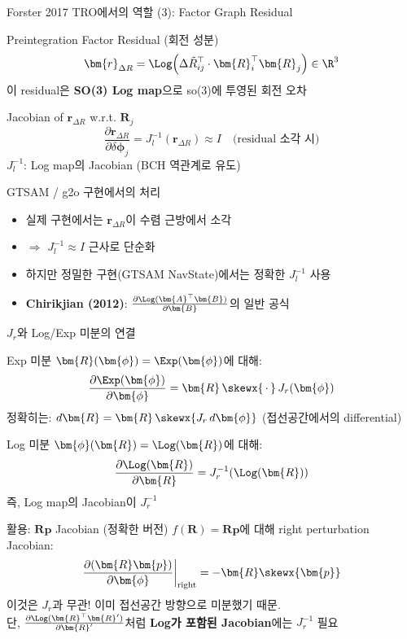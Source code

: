\begin{frame}{Forster 2017 TRO에서의 역할 (3): Factor Graph Residual}
  \begin{block}{Preintegration Factor Residual (회전 성분)}
    \[
      \bm{r}_{\Delta R} = \Log\!\left(\Delta\tilde{R}_{ij}^\top \cdot \bm{R}_i^\top \bm{R}_j\right) \in \R^3
    \]
    이 residual은 \textbf{SO(3) Log map}으로 so(3)에 투영된 회전 오차
  \end{block}
  \pause
  \begin{alertblock}{Jacobian of $\bm{r}_{\Delta R}$ w.r.t. $\bm{R}_j$}
    \[
      \frac{\partial\bm{r}_{\Delta R}}{\partial\delta\bm{\phi}_j}
      = J_l^{-1}\!\left(\bm{r}_{\Delta R}\right)
      \approx I \quad \text{(residual 소각 시)}
    \]
    $J_l^{-1}$: Log map의 Jacobian (BCH 역관계로 유도)
  \end{alertblock}
  \pause
  \begin{exampleblock}{GTSAM / g2o 구현에서의 처리}
    \begin{itemize}
      \item 실제 구현에서는 $\bm{r}_{\Delta R}$이 수렴 근방에서 소각
      \item $\Rightarrow$ $J_l^{-1} \approx I$ 근사로 단순화
      \item 하지만 정밀한 구현(GTSAM NavState)에서는 정확한 $J_l^{-1}$ 사용
      \item \textbf{Chirikjian (2012)}: $\frac{\partial \Log(\bm{A}^\top\bm{B})}{\partial\bm{B}}$의 일반 공식
    \end{itemize}
  \end{exampleblock}
\end{frame}


\begin{frame}[shrink=5]{$J_r$와 Log/Exp 미분의 연결}
  \begin{block}{Exp 미분}
    $\bm{R}(\bm{\phi}) = \Exp(\bm{\phi})$에 대해:
    \[
      \frac{\partial \Exp(\bm{\phi})}{\partial \bm{\phi}} = \bm{R}\,\skewx{\,\cdot\,}\,J_r(\bm{\phi})
    \]
    정확히는: $d\bm{R} = \bm{R}\,\skewx{J_r\,d\bm{\phi}}$ (접선공간에서의 differential)
  \end{block}
  \pause
  \begin{block}{Log 미분}
    $\bm{\phi}(\bm{R}) = \Log(\bm{R})$에 대해:
    \[
      \frac{\partial \Log(\bm{R})}{\partial \bm{R}} = J_r^{-1}\!\left(\Log(\bm{R})\right)
    \]
    즉, Log map의 Jacobian이 $J_r^{-1}$
  \end{block}
  \pause
  \begin{alertblock}{활용: $\bm{R}\bm{p}$ Jacobian (정확한 버전)}
    $f(\bm{R}) = \bm{R}\bm{p}$에 대해 right perturbation Jacobian:
    \[
      \frac{\partial(\bm{R}\bm{p})}{\partial\bm{\phi}}\bigg|_{\text{right}} = -\bm{R}\skewx{\bm{p}}
    \]
    이것은 $J_r$과 무관! 이미 접선공간 방향으로 미분했기 때문.\\
    \medskip
    단, $\frac{\partial \Log(\bm{R}^\top\bm{R}')}{\partial \bm{R}'}$처럼 \textbf{Log가 포함된 Jacobian}에는 $J_r^{-1}$ 필요
  \end{alertblock}
\end{frame}


